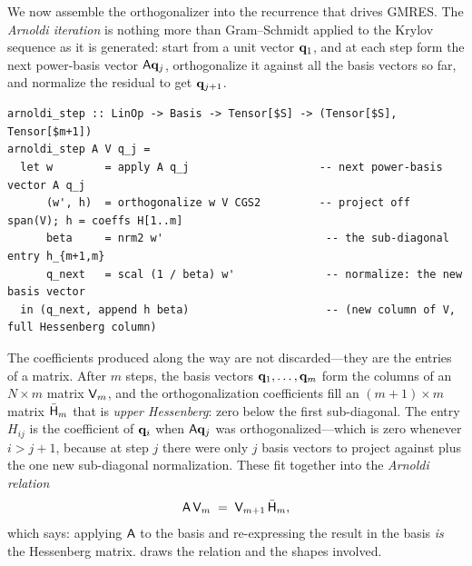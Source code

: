 We now assemble the orthogonalizer into the recurrence that drives GMRES. The
\emph{Arnoldi iteration} is nothing more than Gram--Schmidt applied to the Krylov
sequence as it is generated: start from a unit vector $\mathbf{q}_1$, and at each step form
the next power-basis vector $\mathsf{A}\mathbf{q}_j$, orthogonalize it against all the basis
vectors so far, and normalize the residual to get $\mathbf{q}_{j+1}$.

\begin{lstlisting}[style=l4style]
arnoldi_step :: LinOp -> Basis -> Tensor[$S] -> (Tensor[$S], Tensor[$m+1])
arnoldi_step A V q_j =
  let w        = apply A q_j                    -- next power-basis vector A q_j
      (w', h)  = orthogonalize w V CGS2         -- project off span(V); h = coeffs H[1..m]
      beta     = nrm2 w'                         -- the sub-diagonal entry h_{m+1,m}
      q_next   = scal (1 / beta) w'              -- normalize: the new basis vector
  in (q_next, append h beta)                     -- (new column of V, full Hessenberg column)
\end{lstlisting}

The coefficients produced along the way are not discarded---they are the entries of a
matrix. After $m$ steps, the basis vectors $\mathbf{q}_1,\dots,\mathbf{q}_m$ form the columns of an
$N\times m$ matrix $\mathsf{V}_m$, and the orthogonalization coefficients fill an
$(m+1)\times m$ matrix $\bar{\mathsf{H}}_m$ that is \emph{upper Hessenberg}: zero below
the first sub-diagonal. The entry $H_{ij}$ is the coefficient of $\mathbf{q}_i$ when
$\mathsf{A}\mathbf{q}_j$ was orthogonalized---which is zero whenever $i > j+1$, because at step
$j$ there were only $j$ basis vectors to project against plus the one new
sub-diagonal normalization. These fit together into the \emph{Arnoldi relation}
\[
  \mathsf{A}\,\mathsf{V}_m \;=\; \mathsf{V}_{m+1}\,\bar{\mathsf{H}}_m,
\]
which says: applying $\mathsf{A}$ to the basis and re-expressing the result in the basis
\emph{is} the Hessenberg matrix.  draws the relation and the shapes
involved.

